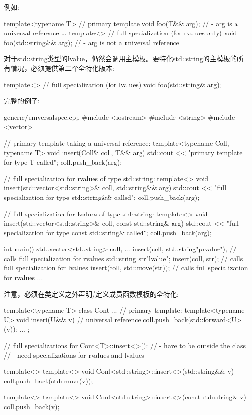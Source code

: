 例如:\par

\begin{codebox}[cpp]
template<typename T> // primary template
void foo(T&& arg); // - arg is a universal reference
...
template<> // full specialization (for rvalues only)
void foo(std::string&& arg); // - arg is not a universal reference
\end{codebox}

对于std::string类型的lvalue，仍然会调用主模板。要特化std::string的主模板的所有情况，必须提供第二个全特化版本:\par

\begin{codebox}[cpp]
template<> // full specialization (for lvalues)
void foo(std::string& arg);
\end{codebox}

完整的例子:\par

\begin{codeboxt}[cpp]{generic/universalspec.cpp}
#include <iostream>
#include <string>
#include <vector>

// primary template taking a universal reference:
template<typename Coll, typename T>
void insert(Coll& coll, T&& arg)
{
  std::cout << "primary template for type T called\n";
  coll.push_back(arg);
}

// full specialization for rvalues of type std::string:
template<>
void insert(std::vector<std::string>& coll, std::string&& arg)
{
  std::cout << "full specialization for type std::string&& called\n";
  coll.push_back(arg);
}

// full specialization for lvalues of type std::string:
template<>
void insert(std::vector<std::string>& coll, const std::string& arg)
{
  std::cout << "full specialization for type const std::string& called\n";
  coll.push_back(arg);
}

int main()
{
  std::vector<std::string> coll;
  ...
  insert(coll, std::string{"prvalue"}); // calls full specialization for rvalues
  std::string str{"lvalue"};
  insert(coll, str); // calls full specialization for lvalues
  insert(coll, std::move(str)); // calls full specialization for rvalues
  ...
}
\end{codeboxt}

注意，必须在类定义之外声明/定义成员函数模板的全特化:\par

\begin{codebox}[cpp]
template<typename T>
class Cont {
  ...
  // primary template:
  template<typename U>
  void insert(U&& v) { // universal reference
    coll.push_back(std::forward<U>(v));
  }
  ...
};

// full specializations for Cont<T>::insert<>():
// - have to be outside the class
// - need specializations for rvalues and lvalues

template<>
  template<>
void Cont<std::string>::insert<>(std::string&& v)
{
  coll.push_back(std::move(v));
}

template<>
  template<>
void Cont<std::string>::insert<>(const std::string& v)
{
  coll.push_back(v);
}
\end{codebox}


